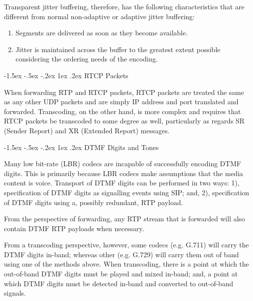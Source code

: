 \documentclass[letterpaper,final,notitlepage,twocolumn,10pt,twoside]{article}
\makeatletter
\let\normalsize = \small
\let\small = \footnotesize
\let\footnotesize = \scriptsize
\let\scriptsize = \tiny
\renewcommand\subsection{\@startsection{subsection}{2}{\z@}%
                                     {-1.5ex \@plus -.5ex \@minus -.2ex}%
                                     {1ex \@plus .2ex}%
                                     {\normalfont\normalsize\bfseries}}
\makeatother
\begin{document}
Transparent jitter buffering, therefore, has the following characteristics that
are different from normal non-adaptive or adaptive jitter buffering:

\begin{enumerate}

\item Segments are delivered as soon as they become available.

\item Jitter is maintained across the buffer to the greatest extent possible
considering the ordering needs of the encoding.

\end{enumerate}

\subsection{RTCP Packets}

When forwarding RTP and RTCP packets, RTCP packets are treated the same as any
other UDP packets and are simply IP address and port translated and forwarded.
Transcoding, on the other hand, is more complex and requires that RTCP packets
be transcoded to some degree as well, particularly as regards SR (Sender Report)
and XR (Extended Report) messages.

\subsection{DTMF Digits and Tones}

Many low bit-rate (LBR) codecs are incapable of successfully encoding DTMF
digits.  This is primarily because LBR codecs make assumptions that the media
content is voice.  Transport of DTMF digits can be performed in two ways: 1),
specification of DTMF digits as signalling events using SIP; and, 2),
specification of DTMF digits using a, possibly redundant, RTP payload.

From the perspective of forwarding, any RTP stream that is forwarded will also
contain DTMF RTP payloads when necessary.

From a transcoding perspective, however, some codecs (e.g. G.711) will carry the
DTMF digits in-band; whereas other (e.g. G.729) will carry them out of band
using one of the methods above.  When transcoding, there is a point at which the
out-of-band DTMF digits must be played and mixed in-band; and, a point at which
DTMF digits must be detected in-band and converted to out-of-band signals.
\end{document}
